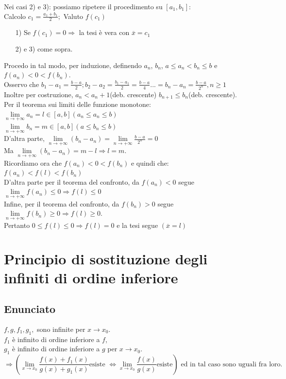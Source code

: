 \documentclass{article}
\newcommand{\vSpace}{\vspace{1em}}
\newcommand{\hSpace}{\hspace{1em}}
\begin{document}
\begin{flushleft}
Nei casi 2) e 3): possiamo ripetere il procedimento su $[a_1, b_1]$:\\
Calcolo $c_1 = \frac{a_1 + b_1}{2};$ Valuto $f(c_1)$\\
\begin{enumerate}
    \item[1)] Se $f(c_1) = 0 \Rightarrow$ la tesi è vera con $\overline{x} = c_1$\\
    \item[2)] e 3) come sopra. 
\end{enumerate}

Procedo in tal modo, per induzione, definendo $a_n$, $b_n$, $a \leq a_n < b_n \leq b$ e $f(a_n) < 0 < f(b_n)$.\\
Osservo che $b_1 - a_1 = \frac{b-a}{2}; b_2-a_2 = \frac{b_1-a_1}{2} = \frac{b-a}{4}...=b_n - a_n = \frac{b-a}{2^n}, n \geq 1$\\
Inoltre per costruzione, $a_n < a_n+1$(deb. crescente) $b_{n+1} \leq b_n$(deb. crescente).\\
Per il teorema sui limiti delle funzione monotone:\\
\hSpace $\lim\limits_{n \to + \infty}a_n = l \in [a,b] (a_n \leq a_n \leq b)$\\
\hSpace $\lim\limits_{n \to + \infty}b_n = m \in [a,b] (a \leq b_n \leq b)$\\
D'altra parte, $\lim\limits_{n \to + \infty}(b_n - a_n) = \lim\limits_{n \to + \infty}\frac{b-a}{2^n} = 0$\\
Ma $\lim\limits_{n \to + \infty} (b_n - a_n) = m - l \Rightarrow l = m$.\\
Ricordiamo ora che $f(a_n) < 0 < f(b_n)$ e quindi che: $f(a_n) < f(l) < f(b_n)$\\
\vSpace
D'altra parte per il teorema del confronto, da $f(a_n) < 0$ segue $\lim\limits_{n \to + \infty}f(a_n) \leq 0 \Rightarrow f(l) \leq 0$\\
Infine, per il teorema del confronto, da $f(b_n) > 0 $ segue $\lim\limits_{n \to + \infty}f(b_n) \geq 0 \Rightarrow f(l) \geq 0$.\\
Pertanto $0 \leq f(l) \leq 0 \Rightarrow f(l) = 0$ e la tesi segue $(\overline{x} = l)$

\section{Principio di sostituzione degli infiniti di ordine inferiore}
\subsection{Enunciato}
$f, g, f_1, g_1,$ sono infinite per $ x \to x_0$.\\
$f_1$ è infinito di ordine inferiore a $f$,\\
$g_1$ è infinito di ordine inferiore a $g$ per $x \to x_0$.
\[
\Rightarrow (\lim\limits_{x \to x_0}\frac{f(x)+f_1(x)}{g(x)+g_1(x)} \text{esiste } \iff \lim\limits_{x \to x_0}\frac{f(x)}{g(x)} \text{esiste})\text{ ed in tal caso sono uguali fra loro.}
\]

\end{flushleft}
\end{document}
